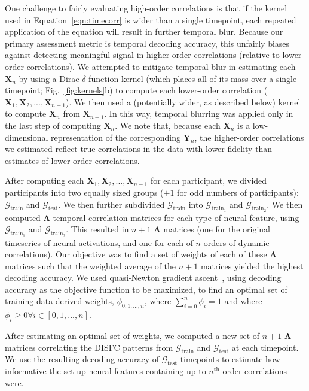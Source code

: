 \documentclass[english]{article}
\begin{document}
One challenge to fairly evaluating high-order correlations is that if
the kernel used in Equation~\ref{eqn:timecorr} is wider than a single
timepoint, each repeated application of the equation will result in
further temporal blur.  Because our primary assessment metric is
temporal decoding accuracy, this unfairly biases against detecting
meaningful signal in higher-order correlations (relative to
lower-order correlations).  We attempted to mitigate temporal blur in
estimating each $\mathbf{X}_n$ by using a Dirac $\delta$ function
kernel (which places all of its mass over a single timepoint;
Fig.~\ref{fig:kernels}b) to compute each lower-order correlation
($\mathbf{X}_1, \mathbf{X}_2, ..., \mathbf{X}_{n-1}$).  We then used a
(potentially wider, as described below) kernel to compute $\mathbf{X}_{n}$ from
$\mathbf{X}_{n-1}$.  In this way, temporal blurring was applied only in the
last step of computing $\mathbf{X}_n$.  We note that, because each
$\mathbf{X}_n$ is a low-dimensional representation of the
corresponding $\mathbf{Y}_n$, the higher-order correlations we
estimated reflect true correlations in the data with lower-fidelity
than estimates of lower-order correlations.

After computing each
$\mathbf{X}_1, \mathbf{X}_2, ..., \mathbf{X}_{n-1}$ for each
participant, we divided participants into two equally sized groups
($\pm 1$ for odd numbers of participants):
$\mathcal{G}_{\mathrm{train}}$ and $\mathcal{G}_{\mathrm{test}}$.  We
then further subdivided $\mathcal{G}_{\mathrm{train}}$ into
$\mathcal{G}_{\mathrm{train}_1}$ and $\mathcal{G}_{\mathrm{train}_2}$.
We then computed $\mathbf{\Lambda}$ temporal correlation matrices for
each type of neural feature, using $\mathcal{G}_{\mathrm{train}_1}$
and $\mathcal{G}_{\mathrm{train}_2}$.  This resulted in $n+1$
$\mathbf{\Lambda}$ matrices (one for the original timeseries of neural
activations, and one for each of $n$ orders of dynamic correlations).
Our objective was to find a set of weights of each of these
$\mathbf{\Lambda}$ matrices such that the weighted average of the
$n+1$ matrices yielded the highest decoding accuracy.  We used
quasi-Newton gradient ascent~\citep{NoceWrig06}, using decoding
accuracy as the objective function to be maximized, to find an optimal
set of training data-derived weights, $\phi_{0, 1, ..., n}$, where
$\sum_{i=0}^n \phi_i = 1$ and where
$\phi_i \geq 0 \forall i \in \left[0, 1, ..., n\right]$.

After estimating an optimal set of weights, we computed a new set of
$n + 1$ $\mathbf{\Lambda}$ matrices correlating the DISFC patterns
from $\mathcal{G}_{\mathrm{train}}$ and $\mathcal{G}_{\mathrm{test}}$
at each timepoint.  We use the resulting decoding accuracy of
$\mathcal{G}_{\mathrm{test}}$ timepoints to estimate how informative
the set up neural features containing up to $n^\mathrm{th}$ order
correlations were.
\end{document}
